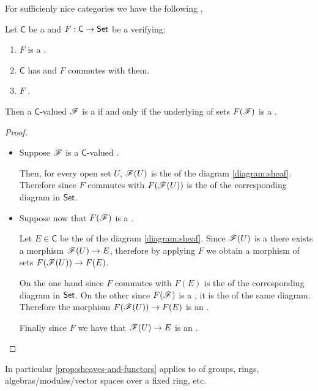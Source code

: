 \documentclass[../main.tex]{subfiles}
\begin{document}
For sufficienly nice categories we have the following \cite[\href{https://stacks.math.columbia.edu/tag/0073}{Tag 0073}]{stacks-project},
\begin{proposition} \label{prop:sheaves-and-functors}
  Let \(\mathsf{C}\) be a  and \(F: \mathsf{C} \to \mathsf{Set}\) be a  verifying:
  \begin{enumerate}
    \item \(F\) is a .
    \item \(\mathsf{C}\) has  and \(F\) commutes with them.
    \item \(F\)  .
  \end{enumerate}
  Then a \(\mathsf{C}\)-valued  \(\mathscr{F}\) is a  if and only if the underlying  of sets \(F(\mathscr{F})\) is a .
\end{proposition}
\begin{proof}~
  \begin{itemize}
    \item[\(\implies\)] Suppose \(\mathscr{F}\) is a \(\mathsf{C}\)-valued .

          Then, for every open set \(U\), \(\mathscr{F}(U)\) is the  of the diagram \eqref{diagram:sheaf}.
          Therefore since \(F\) commutes with  \(F(\mathscr{F}(U))\) is the  of the corresponding diagram in \(\mathsf{Set}\).
    \item[\(\impliedby\)] Suppose now that \(F(\mathscr{F})\) is a .

          Let \(E \in \mathsf{C}\) be the  of the diagram \eqref{diagram:sheaf}.
          Since \(\mathscr{F}(U)\) is a  there exists a morphism \(\mathscr{F}(U) \to E\), therefore by applying \(F\) we obtain a morphism of sets \(F(\mathscr{F}(U)) \to F(E)\).

          On the one hand since \(F\) commutes with  \(F(E)\) is the  of the corresponding diagram in \(\mathsf{Set}\).
          On the other since \(F(\mathscr{F})\) is a , it is the  of the same diagram.
          Therefore the morphism \(F(\mathscr{F}(U)) \to  F(E)\) is an .

          Finally since \(F\)   we have that \(\mathscr{F}(U) \to E\) is an .
  \end{itemize}
\end{proof}
In particular \autoref{prop:sheaves-and-functors} applies to  of groups, rings, algebras/modules/vector spaces over a fixed ring, etc.
\end{document}

